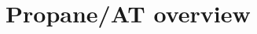 \documentclass[numbers, 10pt, preprint]{sigplanconf}
\newcommand{\sysname}{{\text{}\small \sf Propane/AT}\xspace}
\newcommand{\sysnamesec}{{\sf Propane/AT}\xspace}
\begin{document}
%

%
%
%
%

\section{Propane/AT overview}
\label{sec:overview}

%
%
\end{document}
